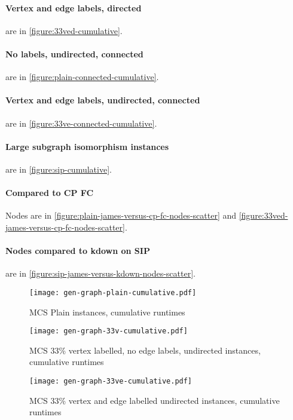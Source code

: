 \documentclass[letterpaper]{article}
\begin{document}
\paragraph{Vertex and edge labels, directed} are in \cref{figure:33ved-cumulative}.

\paragraph{No labels, undirected, connected} are in \cref{figure:plain-connected-cumulative}.

\paragraph{Vertex and edge labels, undirected, connected} are in \cref{figure:33ve-connected-cumulative}.

\paragraph{Large subgraph isomorphism instances} are in \cref{figure:sip-cumulative}.

\paragraph{Compared to CP FC} Nodes are in \cref{figure:plain-james-versus-cp-fc-nodes-scatter} and \cref{figure:33ved-james-versus-cp-fc-nodes-scatter}.

\paragraph{Nodes compared to kdown on SIP} are in \cref{figure:sip-james-versus-kdown-nodes-scatter}.

\begin{figure}
    \centering
    \texttt{[image: gen-graph-plain-cumulative.pdf]}
    \caption{MCS Plain instances, cumulative runtimes}\label{figure:plain-cumulative}
\end{figure}

\begin{figure}
    \centering
    \texttt{[image: gen-graph-33v-cumulative.pdf]}
    \caption{MCS 33\% vertex labelled, no edge labels, undirected instances, cumulative runtimes}\label{figure:33v-cumulative}
\end{figure}

\begin{figure}
    \centering
    \texttt{[image: gen-graph-33ve-cumulative.pdf]}
    \caption{MCS 33\% vertex and edge labelled undirected instances, cumulative runtimes}\label{figure:33ve-cumulative}
\end{figure}
\end{document}
